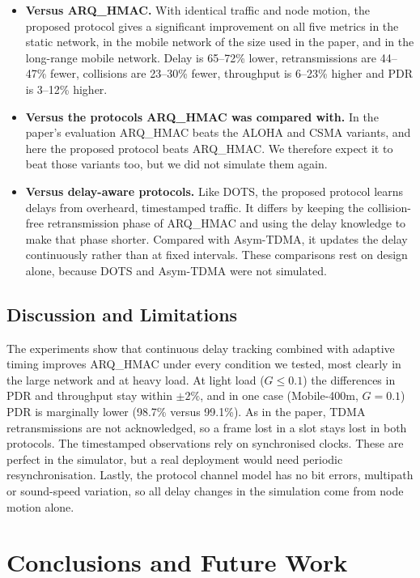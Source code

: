 \documentclass{article}
\begin{document}
\begin{itemize}
    \item \textbf{Versus ARQ\_HMAC.} With identical traffic and node motion, the proposed protocol gives a significant improvement on all five metrics in the static network, in the mobile network of the size used in the paper, and in the long-range mobile network. Delay is 65--72\% lower, retransmissions are 44--47\% fewer, collisions are 23--30\% fewer, throughput is 6--23\% higher and PDR is 3--12\% higher.
    \item \textbf{Versus the protocols ARQ\_HMAC was compared with.} In the paper's evaluation ARQ\_HMAC beats the ALOHA and CSMA variants, and here the proposed protocol beats ARQ\_HMAC. We therefore expect it to beat those variants too, but we did not simulate them again.
    \item \textbf{Versus delay-aware protocols.} Like DOTS, the proposed protocol learns delays from overheard, timestamped traffic. It differs by keeping the collision-free retransmission phase of ARQ\_HMAC and using the delay knowledge to make that phase shorter. Compared with Asym-TDMA, it updates the delay continuously rather than at fixed intervals. These comparisons rest on design alone, because DOTS and Asym-TDMA were not simulated.
\end{itemize}

\subsection{Discussion and Limitations}
The experiments show that continuous delay tracking combined with adaptive timing improves ARQ\_HMAC under every condition we tested, most clearly in the large network and at heavy load. At light load ($G \le 0.1$) the differences in PDR and throughput stay within $\pm 2\%$, and in one case (Mobile-400m, $G = 0.1$) PDR is marginally lower (98.7\% versus 99.1\%). As in the paper, TDMA retransmissions are not acknowledged, so a frame lost in a slot stays lost in both protocols. The timestamped observations rely on synchronised clocks. These are perfect in the simulator, but a real deployment would need periodic resynchronisation. Lastly, the protocol channel model has no bit errors, multipath or sound-speed variation, so all delay changes in the simulation come from node motion alone.

\section{Conclusions and Future Work} \label{sec:conclusion}
\end{document}
